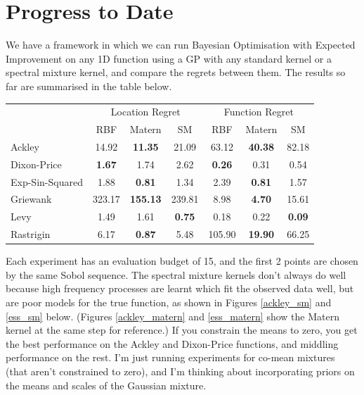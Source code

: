 \documentclass[a4paper]{article}
\begin{document}
\section{Progress to Date}
We have a framework in which we can run Bayesian Optimisation with Expected Improvement on any 1D function using a GP with any standard kernel or a spectral mixture kernel, and compare the regrets between them.
The results so far are summarised in the table below.
\begin{center}
\begin{tabular}{ | l | c | c | c | c | c | c |}
\hline
& \multicolumn{3}{|c|}{Location Regret} & \multicolumn{3}{|c|}{Function Regret} \\
\cline{2-7}
& RBF & Matern & SM & RBF & Matern & SM \\
\hline
Ackley & 14.92 & \textbf{11.35} & 21.09 & 63.12 & \textbf{40.38} & 82.18 \\
\hline
Dixon-Price & \textbf{1.67} & 1.74 & 2.62 & \textbf{0.26} & 0.31 & 0.54 \\
\hline
Exp-Sin-Squared & 1.88 & \textbf{0.81} & 1.34 & 2.39 & \textbf{0.81} & 1.57 \\
\hline
Griewank & 323.17 & \textbf{155.13} & 239.81 & 8.98 & \textbf{4.70} & 15.61 \\
\hline
Levy & 1.49 & 1.61 & \textbf{0.75} & 0.18 & 0.22 & \textbf{0.09} \\
\hline
Rastrigin & 6.17 & \textbf{0.87} & 5.48 & 105.90 & \textbf{19.90} & 66.25 \\
\hline
\end{tabular}
\end{center}
Each experiment has an evaluation budget of 15, and the first 2 points are chosen by the same Sobol sequence.
The spectral mixture kernels don't always do well because high frequency processes are learnt which fit the observed data well, but are poor models for the true function, as shown in Figures \ref{ackley_sm} and \ref{ess_sm} below.
(Figures \ref{ackley_matern} and \ref{ess_matern} show the Matern kernel at the same step for reference.)
If you constrain the means to zero, you get the best performance on the Ackley and Dixon-Price functions, and middling performance on the rest.
I'm just running experiments for co-mean mixtures (that aren't constrained to zero), and I'm thinking about incorporating priors on the means and scales of the Gaussian mixture.
\end{document}
